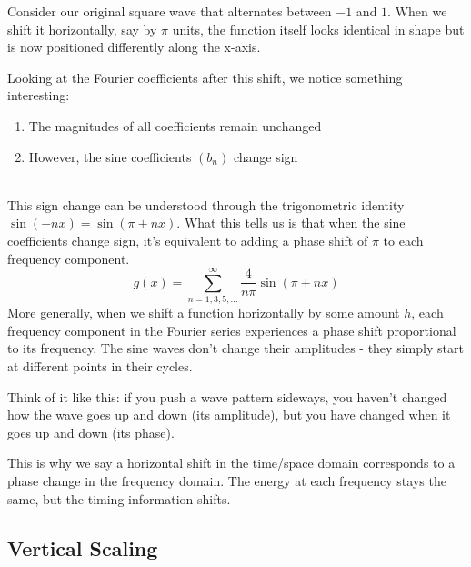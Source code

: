 \documentclass{article}
\begin{document}
Consider our original square wave that alternates between $-1$ and $1$. When we shift it horizontally, say by $\pi$ units, the function itself looks identical in shape but is now positioned differently along the x-axis.

Looking at the Fourier coefficients after this shift, we notice something interesting:

\begin{enumerate}
\item The magnitudes of all coefficients remain unchanged
\item However, the sine coefficients $(b_n)$ change sign
\end{enumerate}\\

This sign change can be understood through the trigonometric identity $\sin(-nx) = \sin(\pi + nx)$. What this tells us is that when the sine coefficients change sign, it's equivalent to adding a phase shift of $\pi$ to each frequency component.
\begin{equation}
g(x) = \sum_{n=1,3,5,...}^{\infty} \frac{4}{n\pi} \sin\left(\pi+nx\right)
\end{equation}
More generally, when we shift a function horizontally by some amount $h$, each frequency component in the Fourier series experiences a phase shift proportional to its frequency. The sine waves don't change their amplitudes - they simply start at different points in their cycles.

Think of it like this: if you push a wave pattern sideways, you haven't changed how the wave goes up and down (its amplitude), but you have changed when it goes up and down (its phase).

This is why we say a horizontal shift in the time/space domain corresponds to a phase change in the frequency domain. The energy at each frequency stays the same, but the timing information shifts.

\subsection{Vertical Scaling}
\end{document}
